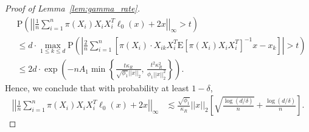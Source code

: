\documentclass[ejsv2,noshowframe]{imsart}
\theoremstyle{plain}
\theoremstyle{definition}
\theoremstyle{remark}
\newcommand{\norm}[1]{\left|\left| #1 \right|\right|}
\begin{document}
\begin{proof}[Proof of Lemma~\ref{lem:gamma_rate}]
\begin{align*}
		&\mathrm{P}\left(\norm{\frac{1}{n}\sum_{i=1}^n \pi(X_i) X_iX_i^T \ell_0(x) + 2x}_{\infty} > t \right) \\
		& \leq d \cdot \max_{1\leq k \leq d} \mathrm{P}\left(\left|\frac{2}{n}\sum_{i=1}^n \left[\pi(X_i) \cdot X_{ik}X_i^T \mathrm{E}\left[\pi(X_i)X_iX_i^T\right]^{-1} x - x_k\right] \right| >t \right)\\
		&\leq 2d \cdot \exp\left(-nA_1\min\left\{\frac{t\kappa_R}{\sqrt{\phi_1}\norm{x}_2},\, \frac{t^2\kappa_R^2}{\phi_1\norm{x}_2^2} \right\} \right).
	\end{align*}
	Hence, we conclude that with probability at least $1-\delta$,
	\begin{align*}
		\norm{\frac{1}{n}\sum_{i=1}^n \pi(X_i) X_iX_i^T \ell_0(x) + 2x}_{\infty} &\lesssim \frac{\sqrt{\phi_1}}{\kappa_R}\norm{x}_2 \left[\sqrt{\frac{\log(d/\delta)}{n}} + \frac{\log(d/\delta)}{n} \right].
	\end{align*}
	

\end{proof}
\end{document}
